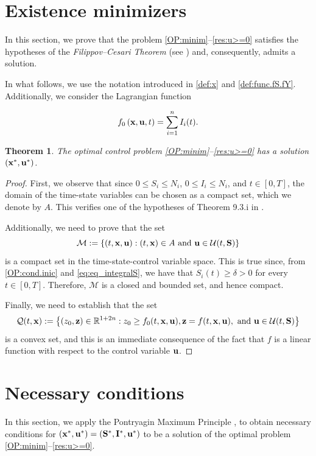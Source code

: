 \documentclass[a4paper,10pt]{article}
\newtheorem{thm}{Theorem}[section]
\theoremstyle{remark}
\begin{document}
\section{Existence minimizers}

In this section, we prove that the problem \eqref{OP:minim}--\eqref{res:u>=0} satisfies the hypotheses of the \emph{Filippov--Cesari Theorem} (see \cite[Th. 9.3.i]{L.Cesari368}) and, consequently, admits a solution.

In what follows, we use the notation introduced in \eqref{def:x} and \eqref{def:func.fS.fY}. Additionally, we consider the Lagrangian function

$$
f_{0}\left(\bold{x}, \bold{u}, t\right)=\sum_{i=1}^{n} I_{i}(t).
$$

\begin{thm}
The optimal control problem \eqref{OP:minim}--\eqref{res:u>=0} has a solution $(\bold{x^*},\bold{u}^{*})$.
\end{thm}

\begin{proof}
First, we observe that since $0\leq S_i\leq N_i$, $0\leq I_i\leq N_i$, and $t\in[0,T]$, the domain of the time-state variables can be chosen as a compact set, which we denote by $A$. This verifies one of the hypotheses of Theorem 9.3.i in \cite{L.Cesari368}.

Additionally, we need to prove that the set
$$ \mathcal{M}:=\left\{(t,\bold{x},\bold{u}): (t,\bold{x})\in A\ \text{and}\ \bold{u}\in \mathcal{U}(t,\bold{S})  \right\}  $$ 
is a compact set in the time-state-control variable space. This is true since, from \eqref{OP:cond.inic} and \eqref{eq:eq_integralS}, we have that $S_i(t)\geq \delta>0$ for every $t\in[0,T]$. Therefore, $\mathcal{M}$ is a closed and bounded set, and hence compact.

Finally, we need to establish that the set $$ \mathcal{Q}(t,\bold{x}):=\left\{(z_0,\bold{z})\in \mathbb{R}^{1+2n}:z_0\geq f_0(t,\bold{x},\bold{u}), \bold{z}=f(t,\bold{x},\bold{u}),\ \text{and}\ \bold{u}\in \mathcal{U}(t,\bold{S}) \right\} $$
is a convex set, and this is an immediate consequence of the fact that $f$ is a linear function with respect to the control variable $\bold{u}$.
\end{proof}

\section{Necessary conditions}\label{sec:nece}

In this section, we apply the Pontryagin Maximum Principle \cite[Th. 4.1]{A.Seierstad499}, \cite{hartl1995survey} to obtain necessary conditions for $(\bold{x}^*,\bold{u}^*)=(\bold{S}^*,\bold{I}^*,\bold{u}^*)$ to be a solution of the optimal problem \eqref{OP:minim}--\eqref{res:u>=0}.
\end{document}

